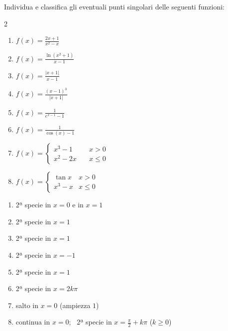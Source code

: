 
\begin{question}[ID=2.6, subtitle={Punti singolari — serie 6}, tags={continuità, punti singolari}, difficulty=media]
Individua e classifica gli eventuali punti singolari delle seguenti funzioni:
\begin{center}\begin{minipage}{0.92\linewidth}
\begin{multicols}{2}
\begin{enumerate}[label=\arabic*),leftmargin=3.2cm]
\item $f(x) = \frac{2x+1}{x^2-x}$
\item $f(x) = \frac{\ln(x^2+1)}{x-1}$
\item $f(x) = \frac{|x+1|}{x-1}$
\item $f(x) = \frac{(x-1)^3}{|x+1|}$
\item $f(x) = \frac{1}{e^{x-1} - 1}$
\item $f(x) = \frac{1}{\cos(x)-1}$
\item $f(x) = \begin{cases} x^3 - 1 \quad & x > 0 \\ x^2 - 2x \quad & x \le 0 \end{cases}$
\item $f(x) = \begin{cases} \tan x & x > 0 \\ x^3 - x & x \le 0 \end{cases}$
\end{enumerate}
\end{multicols}
\end{minipage}\end{center}
\begin{solution}
\begin{enumerate}[label=\arabic*)]
    \item 2ª specie in $x=0$ e in $x=1$
    \item 2ª specie in $x=1$
    \item 2ª specie in $x=1$
    \item 2ª specie in $x=-1$
    \item 2ª specie in $x=1$
    \item 2ª specie in $x=2k\pi$
    \item salto in $x=0$ (ampiezza $1$)
    \item continua in $x=0$; \ 2ª specie in $x=\tfrac\pi2+k\pi$ ($k\geq0$)
\end{enumerate}
\end{solution}

\end{question}
